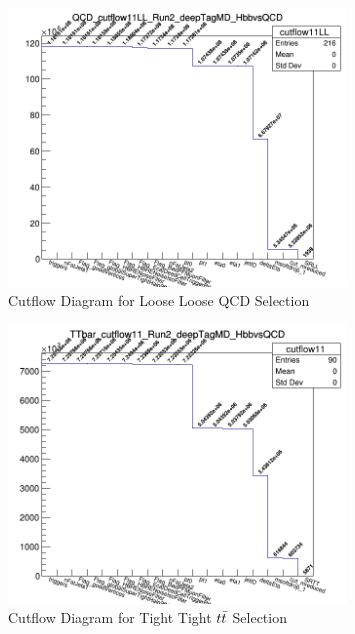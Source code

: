 \begin{figure}[!htb]
	\centering
	\includegraphics[width=0.8\textwidth]{Figures/QCD_cutflow11LL_Run2_deepTagMD_HbbvsQCD.png}
	\caption{Cutflow Diagram for Loose Loose QCD Selection}
	\label{fig:11CutflowqcdLL}
\end{figure}
\begin{figure}[!htb]
	\centering
    \includegraphics[width=0.8\textwidth]{Figures/ttbar_cutflow11_Run2_deepTagMD_HbbvsQCD.png}
	\caption{Cutflow Diagram for Tight Tight $t\bar{t} $ Selection}
	\label{fig:11CutflowttTT}
\end{figure}
